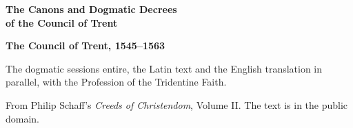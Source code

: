 \documentclass[11pt,letterpaper]{article}
\begin{document}
\color{ink}

\begin{titlepage}
\centering
\vspace*{4em}
{\LARGE\bfseries\color{heading} The Canons and Dogmatic Decrees\\[0.3em]of the Council of Trent\par}
\vspace{2em}
{\Large\bfseries\color{heading} The Council of Trent, 1545--1563\par}
\vspace{2.5em}
{\itshape\color{subhead}\parbox{0.8\linewidth}{\centering The dogmatic sessions entire, the Latin text and the English translation in parallel, with the Profession of the Tridentine Faith.\par}}
\vfill
{\small From Philip Schaff's \emph{Creeds of Christendom}, Volume II. The text is in the public domain.\par}
\vspace{2em}
\end{titlepage}

\tableofcontents


\end{document}
